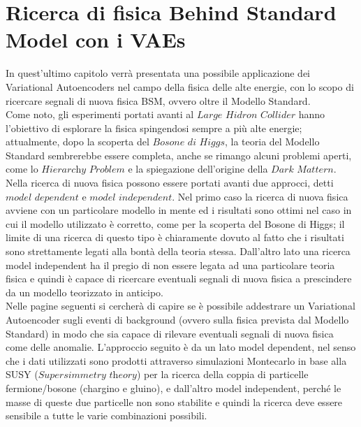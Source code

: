 \section{Ricerca di fisica Behind Standard Model con i VAEs}
\label{fisica_BSM_VAEs}

In quest'ultimo capitolo verrà presentata una possibile applicazione dei Variational Autoencoders nel campo della fisica delle alte energie, con lo scopo di ricercare segnali di nuova fisica BSM, ovvero oltre il Modello Standard. \\
Come noto, gli esperimenti portati avanti al $\textit{Large Hidron Collider}$ hanno l'obiettivo di esplorare la fisica spingendosi sempre a più alte energie; attualmente, dopo la scoperta del $\textit{Bosone di Higgs}$, la teoria del Modello Standard sembrerebbe essere completa, anche se rimango alcuni problemi aperti, come lo $\textit{Hierarchy Problem}$ e la spiegazione dell'origine della $\textit{Dark Mattern}$. \\
Nella ricerca di nuova fisica possono essere portati avanti due approcci, detti $\textit{model dependent}$ e $\textit{model independent}$. Nel primo caso la ricerca di nuova fisica avviene con un particolare modello in mente ed i risultati sono ottimi nel caso in cui il modello utilizzato è corretto, come per la scoperta del Bosone di Higgs; il limite di una ricerca di questo tipo è chiaramente dovuto al fatto che i risultati sono strettamente legati alla bontà della teoria stessa. Dall'altro lato una ricerca model independent ha il pregio di non essere legata ad una particolare teoria fisica e quindi è capace di ricercare eventuali segnali di nuova fisica a prescindere da un modello teorizzato in anticipo.\\
Nelle pagine seguenti si cercherà di capire se è possibile addestrare un Variational Autoencoder sugli eventi di background (ovvero sulla fisica prevista dal Modello Standard) in modo che sia capace di rilevare eventuali segnali di nuova fisica come delle anomalie. L'approccio seguito è da un lato model dependent, nel senso che i dati utilizzati sono prodotti attraverso simulazioni Montecarlo in base alla SUSY ($\textit{Supersimmetry theory}$) per la ricerca della coppia di particelle fermione/bosone (chargino e gluino), e dall'altro model independent, perché le masse di queste due particelle non sono stabilite e quindi la ricerca deve essere sensibile a tutte le varie combinazioni possibili.
\newpage

